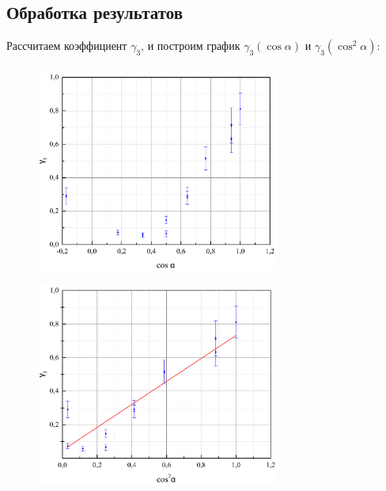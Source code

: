 \documentclass[a4paper,12pt]{article} %
\begin{document}
	\subsection{Обработка результатов}
		Рассчитаем коэффициент $ \gamma_3$, и построим график  $ \gamma_3(\cos\alpha) $ и $ \gamma_3(\cos^2\alpha) $:
		\begin{figure}[h!]
			\begin{floatrow}
				{\includegraphics[width=8cm,height=7cm]{graph1}}
				{\includegraphics[width=8cm,height=7cm]{graph2}}         
			\end{floatrow}
		\end{figure}
		
\end{document}
